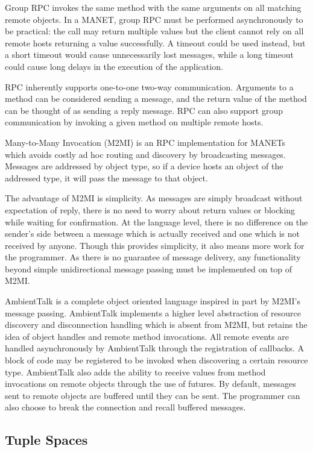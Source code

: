 Group RPC invokes the same method with the same arguments on all matching remote objects. In a MANET, group RPC must be performed asynchronously to be practical: the call may return multiple values but the client cannot rely on all remote hosts returning a value successfully. A timeout could be used instead, but a short timeout would cause unnecessarily lost messages, while a long timeout could cause long delays in the execution of the application.

RPC inherently supports one-to-one two-way communication. Arguments to a method can be considered sending a message, and the return value of the method can be thought of as sending a reply message. RPC can also support group communication by invoking a given method on multiple remote hosts.

Many-to-Many Invocation (M2MI)\cite{m2mi} is an RPC implementation for MANETs which avoids costly ad hoc routing and discovery by broadcasting messages. Messages are addressed by object type, so if a device hosts an object of the addressed type, it will pass the message to that object.

The advantage of M2MI is simplicity. As messages are simply broadcast without expectation of reply, there is no need to worry about return values or blocking while waiting for confirmation. At the language level, there is no difference on the sender's side between a message which is actually received and one which is not received by anyone. Though this provides simplicity, it also means more work for the programmer. As there is no guarantee of message delivery, any functionality beyond simple unidirectional message passing must be implemented on top of M2MI.

AmbientTalk\cite{ambienttalk} is a complete object oriented language inspired in part by M2MI's message passing. AmbientTalk implements a higher level abstraction of resource discovery and disconnection handling which is absent from M2MI, but retains the idea of object handles and remote method invocations. All remote events are handled asynchronously by AmbientTalk through the registration of callbacks. A block of code may be registered to be invoked when discovering a certain resource type. AmbientTalk also adds the ability to receive values from method invocations on remote objects through the use of futures. By default, messages sent to remote objects are buffered until they can be sent. The programmer can also choose to break the connection and recall buffered messages.

\subsection{Tuple Spaces}

